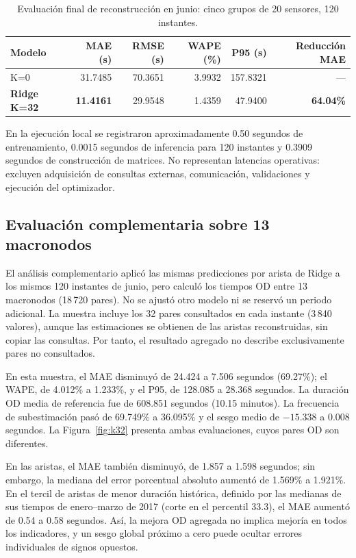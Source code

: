 \documentclass[letterpaper,11pt]{article}
\begin{document}
\begin{table}[htbp]\centering\small
\caption{Evaluación final de reconstrucción en junio: cinco grupos de 20 sensores, 120 instantes.}\label{tab:principal}
\begin{tabular}{@{}lrrrrr@{}}\toprule
Modelo & MAE (s) & RMSE (s) & WAPE (\%) & P95 (s) & Reducción MAE \\ \midrule
K=0 & 31.7485 & 70.3651 & 3.9932 & 157.8321 & --- \\
\textbf{Ridge K=32} & \textbf{11.4161} & 29.9548 & 1.4359 & 47.9400 & \textbf{64.04\%} \\ \bottomrule
\end{tabular}
\end{table}

En la ejecución local se registraron aproximadamente 0.50 segundos de entrenamiento, 0.0015 segundos de inferencia para 120 instantes y 0.3909 segundos de construcción de matrices. No representan latencias operativas: excluyen adquisición de consultas externas, comunicación, validaciones y ejecución del optimizador.

\subsection{Evaluación complementaria sobre 13 macronodos}
El análisis complementario aplicó las mismas predicciones por arista de Ridge a los mismos 120 instantes de junio, pero calculó los tiempos OD entre 13 macronodos (18\,720 pares). No se ajustó otro modelo ni se reservó un periodo adicional. La muestra incluye los 32 pares consultados en cada instante (3\,840 valores), aunque las estimaciones se obtienen de las aristas reconstruidas, sin copiar las consultas. Por tanto, el resultado agregado no describe exclusivamente pares no consultados.

En esta muestra, el MAE disminuyó de 24.424 a 7.506 segundos (69.27\%); el WAPE, de 4.012\% a 1.233\%, y el P95, de 128.085 a 28.368 segundos. La duración OD media de referencia fue de 608.851 segundos (10.15 minutos). La frecuencia de subestimación pasó de 69.749\% a 36.095\% y el sesgo medio de $-15.338$ a 0.008 segundos. La Figura~\ref{fig:k32} presenta ambas evaluaciones, cuyos pares OD son diferentes.

En las aristas, el MAE también disminuyó, de 1.857 a 1.598 segundos; sin embargo, la mediana del error porcentual absoluto aumentó de 1.569\% a 1.921\%. En el tercil de aristas de menor duración histórica, definido por las medianas de sus tiempos de enero--marzo de 2017 (corte en el percentil 33.3), el MAE aumentó de 0.54 a 0.58 segundos. Así, la mejora OD agregada no implica mejoría en todos los indicadores, y un sesgo global próximo a cero puede ocultar errores individuales de signos opuestos.
\end{document}
